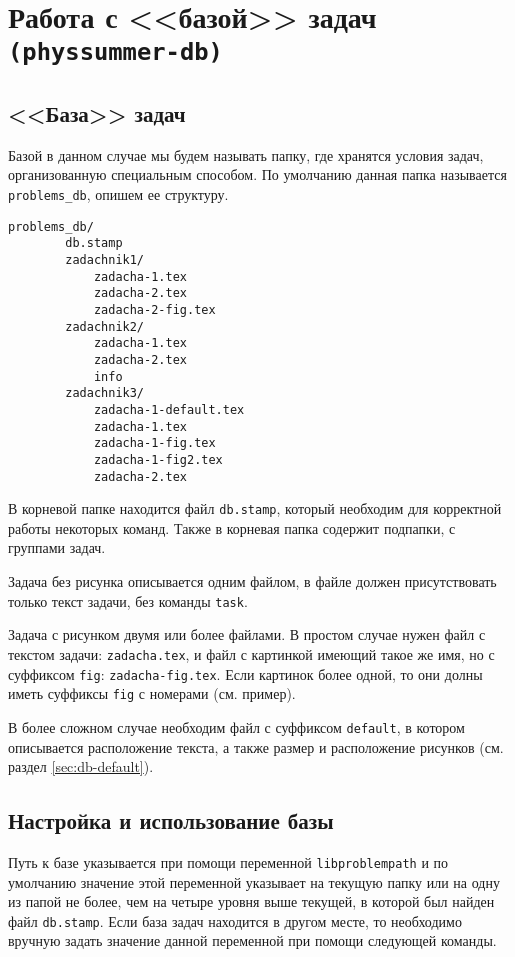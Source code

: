 \section{Работа с <<базой>> задач \texttt{(physsummer-db)}}
\label{sec:db}

\subsection{<<База>> задач}
\label{sec:db-description}

Базой в данном случае мы будем называть папку, где хранятся условия задач, организованную специальным
способом. По умолчанию данная папка называется \texttt{problems\_db}, опишем ее структуру.

\begin{lstlisting}[gobble = 3]
    problems_db/
        db.stamp
        zadachnik1/
            zadacha-1.tex
            zadacha-2.tex
            zadacha-2-fig.tex
        zadachnik2/
            zadacha-1.tex
            zadacha-2.tex
            info
        zadachnik3/
            zadacha-1-default.tex
            zadacha-1.tex
            zadacha-1-fig.tex
            zadacha-1-fig2.tex
            zadacha-2.tex
\end{lstlisting}

В корневой папке находится файл \texttt{db.stamp}, который необходим для корректной работы некоторых
команд. Также в корневая папка содержит подпапки, с группами задач.

Задача без рисунка описывается одним файлом, в файле должен присутствовать только текст задачи, без
команды \texttt{task}.

Задача с рисунком двумя или более файлами. В простом случае нужен файл с текстом задачи:
\texttt{zadacha.tex}, и файл с картинкой имеющий такое же имя, но с суффиксом \texttt{fig}:
\texttt{zadacha-fig.tex}. Если картинок более одной, то они долны иметь суффиксы \texttt{fig} с номерами
(см. пример).

В более сложном случае необходим файл с суффиксом \texttt{default}, в котором описывается расположение
текста, а также размер и расположение рисунков (см. раздел \ref{sec:db-default}).

\subsection{Настройка и использование базы}

Путь к базе указывается при помощи переменной \texttt{libproblempath} и по умолчанию значение этой
переменной указывает на текущую папку или на одну из папой не более, чем на четыре уровня выше текущей, в
которой был найден файл \texttt{db.stamp}. Если база задач находится в другом месте, то необходимо
вручную задать значение данной переменной при помощи следующей команды.

